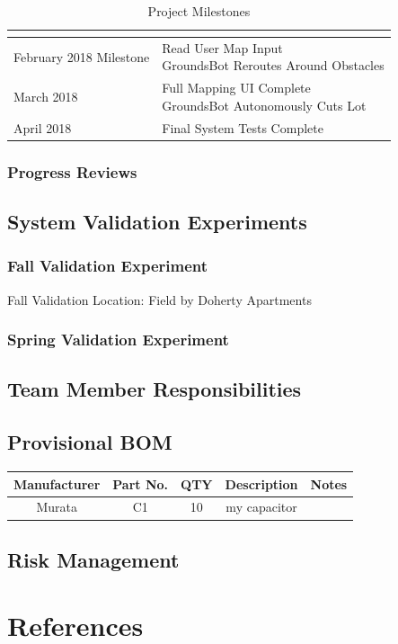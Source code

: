 \documentclass{article}
\begin{document}
\begin{table}[H]
\begin{tabular}{|l|l|}
{  }                                             \\
  \hline
February 2018 Milestone &
  \makecell[l]{
    Read User Map Input                        \\
    GroundsBot Reroutes Around Obstacles       \\
  }                                            \\
  \hline
March 2018 &
  \makecell[l]{
    Full Mapping UI Complete                   \\
    GroundsBot Autonomously Cuts Lot           \\
  }                                            \\
  \hline
April 2018 &
  \makecell[l]{
    Final System Tests Complete                \\
  }                                            \\
  \hline
\end{tabular}
\caption{Project Milestones}\label{Tab:table_milestones}
\end{table}

\subsubsection{Progress Reviews}

\subsection{System Validation Experiments}
\subsubsection{Fall Validation Experiment}
Fall Validation
Location: Field by Doherty Apartments
\subsubsection{Spring Validation Experiment}

\subsection{Team Member Responsibilities}
\subsection{Provisional BOM}
\begin{center}
\begin{tabular}{ |c|c|c|c|c| }
  \hline
    Manufacturer & Part No. & QTY & Description & Notes \\
    \hline 
    Murata & C1 & 10 & my capacitor &  \\
  \hline
\end{tabular}
\end{center}

\subsection{Risk Management}
\section{References}
\end{document}
